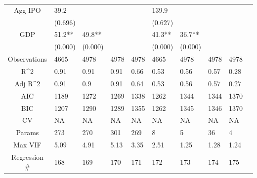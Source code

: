 \documentclass{article}
\begin{document}
\begin{table}[H]
\begin{tabular}{|clllllllll|}
  Agg IPO & 39.2 &  &  &  & 139.9 &  &  &  & \\ 
   & (0.696) &  &  &  & (0.627) &  &  &  & \\ 
  GDP & 51.2** & 49.8** &  &  & 41.3** & 36.7** &  &  & \\ 
   & (0.000) & (0.000) &  &  & (0.000) & (0.000) &  &  & \\ 
  \hline 
 Observations & 4665 & 4978 & 4978 & 4978 & 4665 & 4978 & 4978 & 4978 & \\ 
  R^2 & 0.91 & 0.91 & 0.91 & 0.66 & 0.53 & 0.56 & 0.57 & 0.28 & \\ 
  Adj R^2 & 0.91 & 0.9 & 0.91 & 0.64 & 0.53 & 0.56 & 0.57 & 0.27 & \\ 
  AIC & 1189 & 1272 & 1269 & 1338 & 1262 & 1344 & 1344 & 1370 & \\ 
  BIC & 1207 & 1290 & 1289 & 1355 & 1262 & 1345 & 1346 & 1370 & \\ 
  CV & NA & NA & NA & NA & NA & NA & NA & NA & \\ 
  Params & 273 & 270 & 301 & 269 & 8 & 5 & 36 & 4 & \\ 
  Max VIF & 5.09 & 4.91 & 5.13 & 3.35 & 2.51 & 1.25 & 1.28 & 1.24 & \\ 
  Regression \# & 168 & 169 & 170 & 171 & 172 & 173 & 174 & 175 & \\ 
   \hline
\end{tabular}
 
\end{table}
\end{document}
